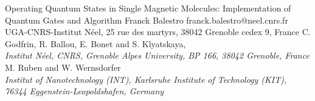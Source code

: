 \begin{conf-abstract}[]
{Operating Quantum States in Single Magnetic Molecules: Implementation of Quantum Gates and Algorithm}
{\color{blue} Franck Balestro}
{franck.balestro@neel.cnrs.fr}
{UGA-CNRS-Institut Néel, 25 rue des martyrs, 38042 Grenoble cedex 9, France}
{{\color{blue}C. Godfrin,  R. Ballou,  E. Bonet and S. Klyatskaya,}\\ \textit{Institut Néel, CNRS, Grenoble Alpes University, BP 166, 38042 Grenoble, France}\\ 
{\color{blue}M. Ruben and W. Wernsdorfer}\\ \textit{ Institut of Nanotechnology (INT), Karlsruhe Institute of Technology (KIT), 76344 Eggenstein-Leopoldshafen, Germany}\\ 
\decofourleft \decofourright}





\printbibliography[heading=none]

\end{conf-abstract}
